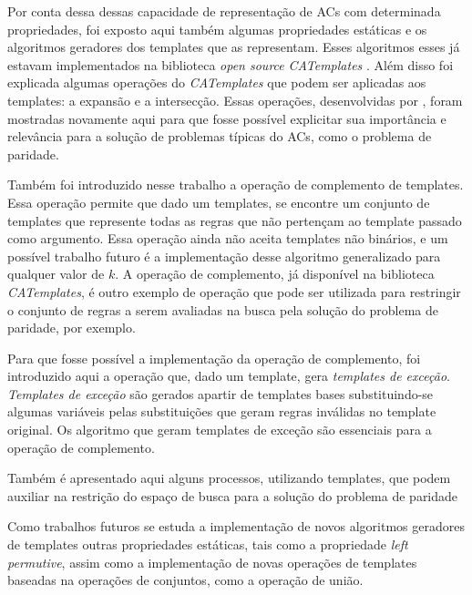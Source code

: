 \documentclass[12pt,a4paper]{article}
\begin{document}
Por conta dessa dessas capacidade de representação de ACs com determinada propriedades, foi exposto aqui também algumas propriedades estáticas e os algoritmos geradores dos templates que as representam. Esses algoritmos esses já estavam implementados na biblioteca \textit{open source} \textit{CATemplates} . Além disso foi explicada algumas operações do \textit{CATemplates} que podem ser aplicadas aos templates: a expansão e a intersecção. Essas operações, desenvolvidas por , foram mostradas novamente aqui para que fosse possível explicitar sua importância e relevância para a solução de problemas típicas do ACs, como o problema de paridade.

Também foi introduzido nesse trabalho a operação de complemento de templates. Essa operação permite que dado um templates, se encontre um conjunto de templates que represente todas as regras que não pertençam ao template passado como argumento. Essa operação ainda não aceita templates não binários, e um possível trabalho futuro é a implementação desse algoritmo generalizado para qualquer valor de $k$. A operação de complemento, já disponível na biblioteca \textit{CATemplates}, é outro exemplo de operação que pode ser utilizada para restringir o conjunto de regras a serem avaliadas na busca pela solução do problema de paridade, por exemplo.

Para que fosse possível a implementação da operação de complemento, foi introduzido aqui a operação que, dado um template, gera \textit{templates de exceção}. \textit{Templates de exceção} são gerados apartir de templates bases substituindo-se algumas variáveis pelas substituições que geram regras inválidas no template original. Os algoritmo que geram templates de exceção são essenciais para a operação de complemento.

Também é apresentado aqui alguns processos, utilizando templates, que podem auxiliar na restrição do espaço de busca para a solução do problema de paridade

Como trabalhos futuros se estuda a implementação de novos algoritmos geradores de templates outras propriedades estáticas, tais como a propriedade \textit{left permutive}, assim como a implementação de novas operações de templates baseadas na operações de conjuntos, como a operação de união.
\end{document}
